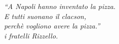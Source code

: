 \begin{recipeblock}
\noindent \textit{``A Napoli hanno inventato la pizza. \\ 
E tutti suonano il clacson, \\ perchè vogliono avere la pizza.'' \\ \normalfont \hspace{1.5cm} \textemdash i fratelli Rizzello.}
\end{recipeblock}
\vfill
